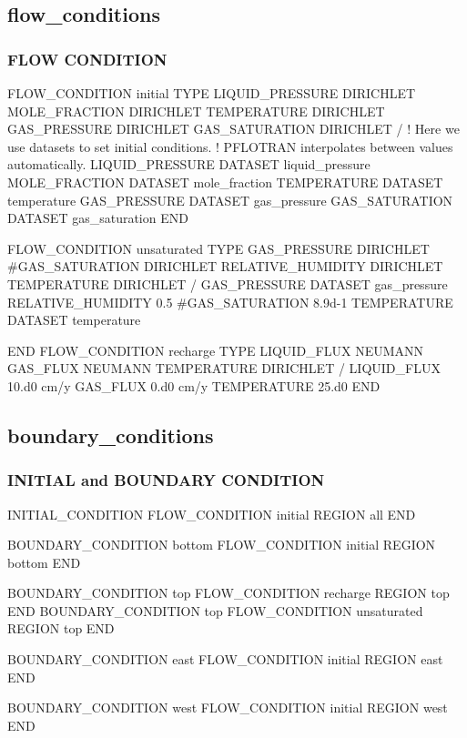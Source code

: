 \documentclass{beamer}
\newcommand\bluecomment[1]{{{\color{blue} #1}}}
\begin{document}
\subsection{flow\_conditions}

\begin{frame}\frametitle{FLOW CONDITION}

\begin{semiverbatim}
FLOW_CONDITION initial
  TYPE
    LIQUID_PRESSURE DIRICHLET
    MOLE_FRACTION DIRICHLET
    TEMPERATURE DIRICHLET
    GAS_PRESSURE DIRICHLET
    GAS_SATURATION DIRICHLET
  / \bluecomment{! Here we use datasets to set initial conditions.} 
    \bluecomment{! PFLOTRAN interpolates between values automatically.}
  LIQUID_PRESSURE DATASET liquid_pressure 
  MOLE_FRACTION DATASET mole_fraction
  TEMPERATURE DATASET temperature
  GAS_PRESSURE DATASET gas_pressure
  GAS_SATURATION DATASET gas_saturation
END



FLOW_CONDITION unsaturated
  TYPE
    GAS_PRESSURE DIRICHLET
    #GAS_SATURATION DIRICHLET
    RELATIVE_HUMIDITY DIRICHLET
    TEMPERATURE DIRICHLET
  /
  GAS_PRESSURE DATASET gas_pressure 
  RELATIVE_HUMIDITY 0.5
  #GAS_SATURATION 8.9d-1 
  TEMPERATURE DATASET temperature 

END
\newpage
FLOW_CONDITION recharge
  TYPE
    LIQUID_FLUX NEUMANN
    GAS_FLUX NEUMANN
    TEMPERATURE DIRICHLET
  /
  LIQUID_FLUX 10.d0 cm/y 
  GAS_FLUX 0.d0 cm/y
  TEMPERATURE 25.d0
END
\end{semiverbatim}

\end{frame}
\subsection{boundary_conditions}

\begin{frame}\frametitle{INITIAL and BOUNDARY CONDITION}

\begin{semiverbatim}
INITIAL_CONDITION
  FLOW_CONDITION initial
  REGION all
END

BOUNDARY_CONDITION bottom
  FLOW_CONDITION initial
  REGION bottom
END

BOUNDARY_CONDITION top
  FLOW_CONDITION recharge
  REGION top
END
\newpage
BOUNDARY_CONDITION top
  FLOW_CONDITION unsaturated
  REGION top
END

BOUNDARY_CONDITION east
  FLOW_CONDITION initial
  REGION east
END

BOUNDARY_CONDITION west
  FLOW_CONDITION initial
  REGION west
END
\end{semiverbatim}

\end{frame}
\end{document}
